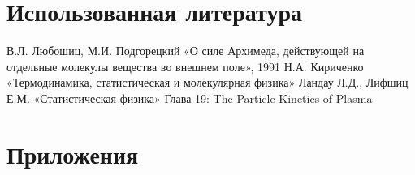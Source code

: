 \documentclass[12pt]{article}
\begin{document}
\section{Использованная литература}
\begin{thebibliography}{9}
    В.Л. Любошиц, М.И. Подгорецкий «О силе Архимеда, действующей на отдельные молекулы вещества во внешнем поле», 1991
    Н.А. Кириченко «Термодинамика, статистическая и молекулярная физика»
    Ландау Л.Д., Лифшиц Е.М. «Статистическая физика»
    Глава 19: The Particle Kinetics of Plasma
\end{thebibliography}

\section{Приложения}
\end{document}
